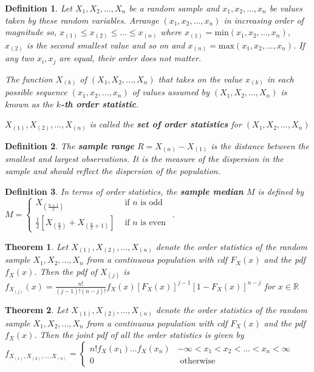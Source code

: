 \documentclass[14pt,twoside]{extreport}
\theoremstyle{dotless}
\newtheorem*{defn}{\footnotesize Definition}
\newtheorem*{thm}{\footnotesize Theorem} %
\begin{document}
\begin{defn}
    Let $X_1, X_2, ..., X_n$ be a random sample and $x_1, x_2, ..., x_n$ be values taken by these random variables.
    Arrange $(x_1, x_2, ..., x_n)$ in increasing order of magnitude so, $x_{(1)} \leq x_{(2)} \leq ... \leq x_{(n)}$
    where $x_{(1)} = \text{min}(x_1, x_2, ..., x_n)$, $x_{(2)}$ is the second smallest value and so on and $x_{(n)} = \text{max}(x_1, x_2, ..., x_n)$. If any two $x_i, x_j$ are equal, their order does not matter.

    
    The function $X_{(k)}$ of $(X_1, X_2, ..., X_n)$ that takes on the value $x_{(k)}$ in each possible sequence $(x_1, x_2, ... , x_n)$ of values assumed by $(X_1, X_2, ..., X_n)$ is known as the \textbf{$k$-th order statistic}. 

    ${X_{(1)}, X_{(2)}, ..., X_{(n)}}$ is called the \textbf{set of order statistics} for $(X_1, X_2, ..., X_n)$
\end{defn}

\begin{defn}
    The \textbf{sample range} $R = X_{(n)} - X_{(1)}$ is the distance between the smallest and largest observations. It is the measure of the dispersion in the sample and should reflect the dispersion of the population.
\end{defn}

\begin{defn}
    In terms of order statistics, the \textbf{sample median} $M$ is defined by \\ 
    $M = \begin{cases} X_{(\frac{n+1}{2})} & \text{ if } n \text{ is odd } \\ \frac{1}{2} \left[ X_{(\frac{n}{2})} + X_{(\frac{n}{2} + 1)}\right] & \text{ if } n \text{ is even } \end{cases}$.
\end{defn}

\begin{thm}
    Let $X_{(1)}, X_{(2)}, ..., X_{(n)}$ denote the order statistics of the random sample $X_1, X_2, ..., X_n$ from a continuous population with cdf $F_X(x)$ and the pdf $f_X(x)$.
    Then the pdf of $X_{(j)}$ is 
    \\$f_{X_{(j)}}(x)= \displaystyle \frac{n!}{(j-1)! (n-j)!} f_X(x) [F_X(x)]^{j-1} [1-F_X(x)]^{n-j}$ for $x \in \mathbb{R}$
\end{thm}

\begin{thm}
    Let $X_{(1)}, X_{(2)}, ..., X_{(n)}$ denote the order statistics of the random sample $X_1, X_2, ..., X_n$ from a continuous population with cdf $F_X(x)$ and the pdf $f_X(x)$. Then the joint pdf of all the order statistics is given by
    \\$ f_{X_{(1)}, X_{(2)}, ..., X_{(n)}} = \begin{cases} n! f_X(x_1) ... f_X(x_n) & -\infty < x_1 < x_2 < ... < x_n < \infty \\ 0 & \text{ otherwise }\end{cases}$
\end{thm}
\end{document}
